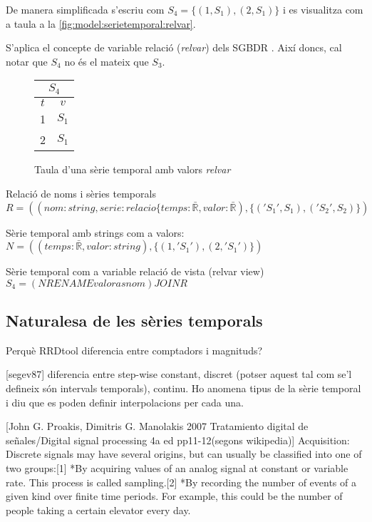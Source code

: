 De manera simplificada s'escriu com
$S_4 =  \{ (1,S_1) , (2,S_1) \}$ 
i es visualitza com a taula a la \autoref{fig:model:serietemporal:relvar}.

S'aplica el concepte de variable relació (\emph{relvar}) dels SGBDR \parencite[sec.\ 3.3]{date:introduction}.
Així doncs, cal notar que $S_4$  no és el mateix que $S_3$.
\begin{figure}[tp]
  \centering
  \begin{tabular}{|c|c|}
    \multicolumn{2}{c}{$S_4$} \\ \hline
    $t$  & $v$ \\ \hline
    1 & $S_1$ \\
    2 & $S_1$ \\ \hline
  \end{tabular}
  \caption{Taula d'una sèrie temporal amb valors \emph{relvar}}
  \label{fig:model:serietemporal:relvar}
\end{figure}


Relació de noms i sèries temporals $R =  ((nom:string,serie:relacio\{temps:\bar{\mathbb{R}},valor:\bar{\mathbb{R}}),\{ ('S_1',S_1),('S_2',S_2)  \})$

Sèrie temporal amb strings com a valors:
$N= ( (temps:\bar{\mathbb{R}},valor:string) ,\{ (1,'S_1') , (2,'S_1') \})$

Sèrie temporal com a variable relació de vista (relvar view)
$S_4 =  (N RENAME valor as nom) JOIN R$



\subsection{Naturalesa de les sèries temporals}


Perquè RRDtool diferencia entre comptadors i magnituds?

[segev87] diferencia entre step-wise constant, discret (potser aquest tal com se'l defineix són intervals temporals), continu. Ho anomena tipus de la sèrie temporal i diu que es poden definir interpolacions per cada una.


[John G. Proakis, Dimitris G. Manolakis 2007 Tratamiento digital de señales/Digital signal processing 4a ed pp11-12(segons wikipedia)] Acquisition: Discrete signals may have several origins, but can usually be classified into one of two groups:[1]
*By acquiring values of an analog signal at constant or variable rate. This process is called sampling.[2]
*By recording the number of events of a given kind over finite time periods. For example, this could be the number of people taking a certain elevator every day.



